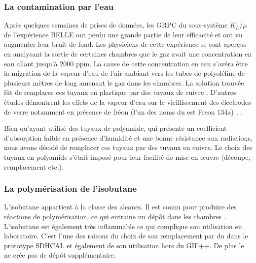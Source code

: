 \subsubsection{La contamination par l'eau}
Après quelques semaines de prises de données, les GRPC du sous-système $K_{L}/\mu$ de l'expérience BELLE ont perdu une grande partie de leur efficacité et ont vu augmenter leur bruit de fond. Les physiciens de cette expérience se sont aperçus en analysant la sortie de certaines chambres que le gaz avait une concentration en eau allant jusqu'à \num{2000} ppm. La cause de cette concentration en eau s'avéra être la migration de la vapeur d'eau de l'air ambiant vers les tubes de polyoléfine de plusieurs mètres de long amenant le gaz dans les chambres. La solution trouvée fût de remplacer ces tuyaux en plastique par des tuyaux de cuivre \cite{Abashian:2000vb}. D'autres études démontrent les effets de la vapeur d'eau sur le vieillissement des électrodes de verre notamment en présence de fréon (l'un des noms du  est Freon 134a) \cite{Sakai:772080}, \cite{Kubo:2002jq}.

\newpage
Bien qu'ayant utilisé des tuyaux de polyamide, qui présente un coefficient d'absorption faible en présence d'humidité et une bonne résistance aux radiations, nous avons décidé de remplacer ces tuyaux par des tuyaux en cuivre. Le choix des tuyaux en polyamide s'était imposé pour leur facilité de mise en œuvre (découpe, remplacement etc.). 

\subsubsection{La polymérisation de l'isobutane}
 L'isobutane  appartient à la classe des alcanes. Il est connu pour produire des réactions de polymérisation, ce qui entraine un dépôt dans les chambres \cite{na60}. L'isobutane est également très inflammable ce qui complique son utilisation en laboratoire. C'est l'une des raisons du choix de son remplacement par du  dans le prototype SDHCAL et également de son utilisation hors du GIF++. De plus le  ne crée pas de dépôt supplémentaire.


